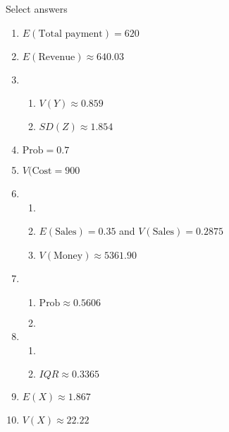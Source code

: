 \documentclass{article}
\begin{document}
Select answers\bigskip
\begin{enumerate}
    \item $E(\text{Total payment}) = 620$
    
    \item $E(\text{Revenue}) \approx 640.03$
    
    \item 
    \begin{enumerate}
        \item $V(Y) \approx 0.859$
        \item $SD(Z) \approx 1.854$
    \end{enumerate}
    
    \item $\text{Prob} = 0.7$
    
    \item $V(\text{Cost} = 900$
    
    \item 
    \begin{enumerate}
        \item 
        \item $E(\text{Sales}) = 0.35$ and $V(\text{Sales}) = 0.2875$
        \item $V(\text{Money}) \approx 5361.90$
    \end{enumerate}
    
    \item 
    \begin{enumerate}
        \item $\text{Prob} \approx 0.5606$
        \item 
    \end{enumerate}
    
    \item 
    \begin{enumerate}
        \item 
        \item $IQR \approx 0.3365$
    \end{enumerate}
    
    \item $E(X) \approx 1.867$
    
    \item $V(X) \approx 22.22$
\end{enumerate}
    
\end{document}
